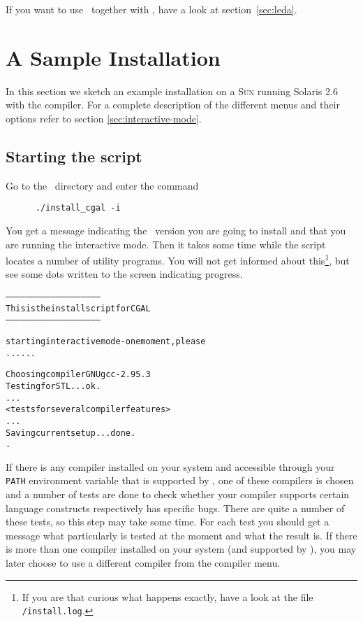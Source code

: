 If you want to use \leda\ together with \cgal, have a look at
section~\ref{sec:leda}.

\section{A Sample Installation}\label{sec:sample-inst}

In this section we sketch an example installation on a \textsc{Sun}
running Solaris 2.6 with the  compiler. For a complete
description of the different menus and their options refer to section
\ref{sec:interactive-mode}.

\subsection{Starting the script}

Go to the \cgaldir\ directory and enter the command
\begin{verbatim}
      ./install_cgal -i
\end{verbatim}

You get a message indicating the \cgal\ version you are going to
install and that you are running the interactive mode. Then it takes
some time while the script locates a number of utility programs. You
will not get informed about this\footnote{If you are that curious what
  happens exactly, have a look at the file
  \texttt{\cgaldir/install.log}.}, but see some
dots written to the screen indicating progress.

{\ccTexHtml{\scriptsize}{}
\begin{alltt}
--------------------------------------------------------
  This is the install script for CGAL \cgalrelease
--------------------------------------------------------

starting interactive mode - one moment, please
......

  Choosing compiler GNU gcc-2.95.3
  Testing for STL ... ok.
  ...
  <tests for several compiler features>
  ...
  Saving current setup ... done.
.
\end{alltt}}
  
If there is any compiler installed on your system and accessible
through your \texttt{PATH} environment variable that is supported by
\cgal, one of these compilers is chosen and a number of tests are done
to check whether your compiler supports certain language constructs
respectively has specific bugs. There are quite a number of these
tests, so this step may take some time. For each test you should get a
message what particularly is tested at the moment and what the result
is. If there is more than one compiler installed on your system (and
supported by \cgal), you may later choose to use a different compiler
from the compiler menu.

